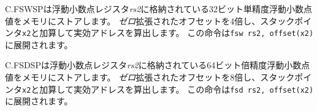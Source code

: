 \begin{comment}
C.FSWSP is an RV32FC-only instruction that stores a single-precision
floating-point value in floating-point register {\em rs2} to memory.  It
computes an effective address by adding the {\em zero}-extended offset, scaled
by 4, to the stack pointer, {\tt x2}.  It expands to {\tt fsw rs2,
offset(x2)}.
\end{comment}
C.FSWSPは浮動小数点レジスタ{\em rs2}に格納されている32ビット単精度浮動小数点値をメモリにストアします。
{\em ゼロ}拡張されたオフセットを4倍し、スタックポインタ{\tt x2}と加算して実効アドレスを算出します。
この命令は{\tt fsw rs2, offset(x2)}に展開されます。

\begin{comment}
C.FSDSP is an RV32DC/RV64DC-only instruction that stores a double-precision
floating-point value in floating-point register {\em rs2} to memory.  It
computes an effective address by adding the {\em zero}-extended offset, scaled
by 8, to the stack pointer, {\tt x2}.  It expands to {\tt fsd rs2,
offset(x2)}.
\end{comment}
C.FSDSPは浮動小数点レジスタ{\em rs2}に格納されている64ビット倍精度浮動小数点値をメモリにストアします。
{\em ゼロ}拡張されたオフセットを8倍し、スタックポインタ{\tt x2}と加算して実効アドレスを算出します。
この命令は{\tt fsd rs2, offset(x2)}に展開されます。

